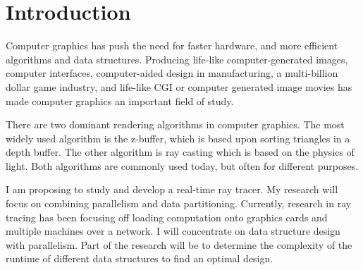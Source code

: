 \section{ Introduction }

Computer graphics has push the need for faster hardware,  and more efficient algorithms and data structures.  Producing life-like computer-generated images, computer interfaces, computer-aided design in manufacturing, a multi-billion dollar game industry, and life-like CGI or computer generated image movies\cite{gaming:2007} has made computer graphics an important field of study.

There are two dominant rendering algorithms in computer graphics.  The most widely used algorithm is the z-buffer, which is based upon sorting triangles in a depth buffer.  The other algorithm is ray casting which is based on the physics of light.  Both algorithms are commonly used today, but often for different purposes.

I am proposing to study and develop a real-time ray tracer.  My research will focus on combining parallelism and data partitioning.  Currently, research in ray tracing has been focusing off loading computation onto graphics cards and multiple machines over a network.  I will concentrate on data structure design with parallelism.  Part of the research will be to determine the complexity of the runtime of different data structures to find an optimal design.

   